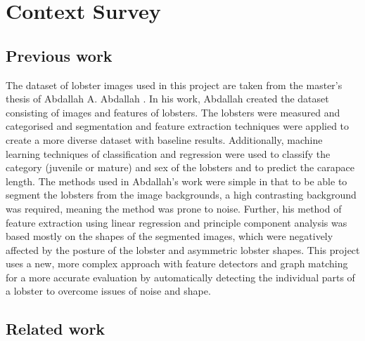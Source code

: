 \section{Context Survey}
\renewcommand{\imgpath}{tex/litreview/imgs}

\subsection{Previous work}
The dataset of lobster images used in this project are taken from the master's thesis of Abdallah A. Abdallah \cite{lobster-thesis}. In his work, Abdallah created the dataset consisting of images and features of lobsters. The lobsters were measured and categorised and segmentation and feature extraction techniques were applied to create a more diverse dataset with baseline results.  Additionally, machine learning techniques of classification and regression were used to classify the category (juvenile or mature) and sex of the lobsters and to predict the carapace length. 
\n
The methods used in Abdallah's work were simple in that to be able to segment the lobsters from the image backgrounds, a high contrasting background was required, meaning the method was prone to noise. Further, his method of feature extraction using linear regression and principle component analysis was based mostly on the shapes of the segmented images, which were negatively affected by the posture of the lobster and asymmetric lobster shapes. This project uses a new, more complex approach  with feature detectors and graph matching for a more accurate evaluation by automatically detecting the individual parts of a lobster to overcome issues of noise and shape. 

\subsection{Related work}

